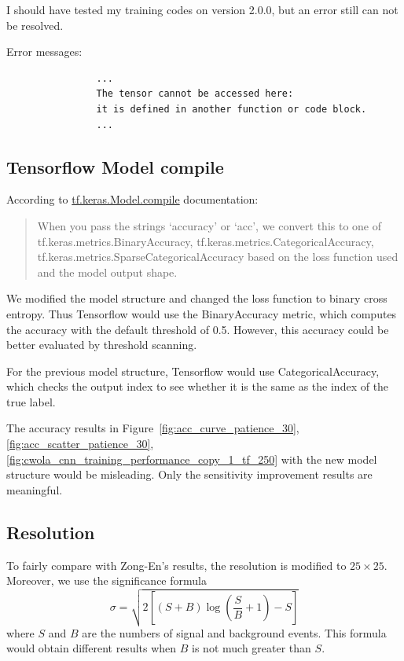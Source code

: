 \documentclass[12pt]{article}
\begin{document}
            I should have tested my training codes on version 2.0.0, but an error still can not be resolved.

            Error messages:
            \begin{verbatim}
                ...
                The tensor cannot be accessed here:
                it is defined in another function or code block. 
                ...
            \end{verbatim}
    \subsection{Tensorflow Model compile}%
    \label{sub:tensorflow_model_compile}
        According to \href{https://www.tensorflow.org/api_docs/python/tf/keras/Model#compile}{tf.keras.Model.compile} documentation:
        \begin{quote}
            When you pass the strings `accuracy' or `acc', we convert this to one of \newline tf.keras.metrics.BinaryAccuracy, tf.keras.metrics.CategoricalAccuracy, \newline tf.keras.metrics.SparseCategoricalAccuracy based on the loss function used and the model output shape.
        \end{quote}
        We modified the model structure and changed the loss function to binary cross entropy. Thus Tensorflow would use the BinaryAccuracy metric, which computes the accuracy with the default threshold of 0.5. However, this accuracy could be better evaluated by threshold scanning.

        For the previous model structure, Tensorflow would use CategoricalAccuracy, which checks the output index to see whether it is the same as the index of the true label.

        The accuracy results in Figure~\ref{fig:acc_curve_patience_30}, \ref{fig:acc_scatter_patience_30}, \ref{fig:cwola_cnn_training_performance_copy_1_tf_250} with the new model structure would be misleading. Only the sensitivity improvement results are meaningful.
    \subsection{Resolution}%
    \label{sub:resolution}
        To fairly compare with Zong-En's results, the resolution is modified to $25 \times 25$. Moreover, we use the significance formula
        \begin{equation}
            \sigma = \sqrt{2\left[ \left( S+B \right) \log\left( \frac{S}{B} + 1 \right) - S  \right] }
        \end{equation}
        where $S$ and $B$ are the numbers of signal and background events. This formula would obtain different results when $B$ is not much greater than $S$.
\end{document}
